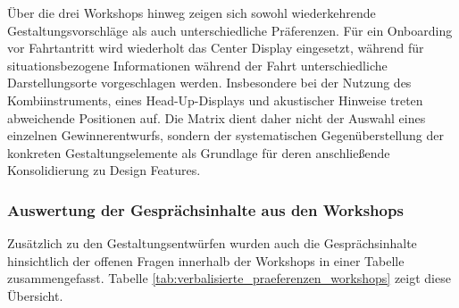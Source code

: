 Über die drei Workshops hinweg zeigen sich sowohl wiederkehrende Gestaltungsvorschläge als auch unterschiedliche Präferenzen. Für ein Onboarding vor Fahrtantritt wird wiederholt das Center Display eingesetzt, während für situationsbezogene Informationen während der Fahrt unterschiedliche Darstellungsorte vorgeschlagen werden. Insbesondere bei der Nutzung des Kombiinstruments, eines Head-Up-Displays und akustischer Hinweise treten abweichende Positionen auf. Die Matrix dient daher nicht der Auswahl eines einzelnen Gewinnerentwurfs, sondern der systematischen Gegenüberstellung der konkreten Gestaltungselemente als Grundlage für deren anschließende Konsolidierung zu Design Features.

\subsubsection{Auswertung der Gesprächsinhalte aus den Workshops}
\label{subsubsec:Auswertung_Gespraechsinhalte_Workshops}

Zusätzlich zu den Gestaltungsentwürfen wurden auch die Gesprächsinhalte hinsichtlich der offenen Fragen innerhalb der Workshops in einer Tabelle zusammengefasst. Tabelle \ref{tab:verbalisierte_praeferenzen_workshops} zeigt diese Übersicht.

